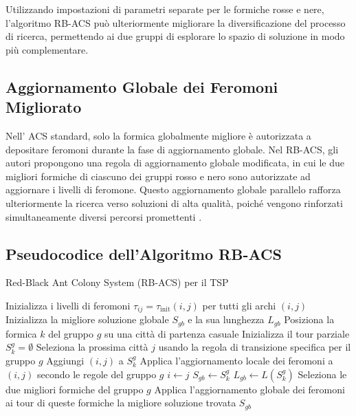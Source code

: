 Utilizzando impostazioni di parametri separate per le formiche rosse e nere, l'algoritmo \gls{RB-ACS} può ulteriormente migliorare la diversificazione del processo di ricerca, permettendo ai due gruppi di esplorare lo spazio di soluzione in modo più complementare.

\subsection{Aggiornamento Globale dei Feromoni Migliorato}
Nell' \gls{ACS} standard, solo la formica globalmente migliore è autorizzata a depositare feromoni durante la fase di aggiornamento globale. Nel \gls{RB-ACS}, gli autori propongono una regola di aggiornamento globale modificata, in cui le due migliori formiche di ciascuno dei gruppi rosso e nero sono autorizzate ad aggiornare i livelli di feromone. Questo aggiornamento globale parallelo rafforza ulteriormente la ricerca verso soluzioni di alta qualità, poiché vengono rinforzati simultaneamente diversi percorsi promettenti \cite{Hassan2013}.

\subsection{Pseudocodice dell'Algoritmo \gls{RB-ACS}}

\begin{algorithm}
	\caption{Red-Black Ant Colony System (\gls{RB-ACS}) per il \gls{TSP}}
	\begin{algorithmic}[1]
		\State Inizializza i livelli di feromoni $\tau_{ij} = \tau_{\text{init}}(i,j)$ per tutti gli archi $(i,j)$
		\State Inizializza la migliore soluzione globale $S_{gb}$ e la sua lunghezza $L_{gb}$
		\State Posiziona la formica $k$ del gruppo $g$ su una città di partenza casuale
		\State Inizializza il tour parziale $S_k^g = \emptyset$
		\Repeat
		\State Seleziona la prossima città $j$ usando la regola di transizione specifica per il gruppo $g$
		\State Aggiungi $(i,j)$ a $S_k^g$
		\State Applica l'aggiornamento locale dei feromoni a $(i,j)$ secondo le regole del gruppo $g$
		\State $i \gets j$
		\State $S_{gb} \gets S_k^g$
		\State $L_{gb} \gets L(S_k^g)$
		\EndIf
		\EndFor
		\EndFor
		\State Seleziona le due migliori formiche del gruppo $g$
		\State Applica l'aggiornamento globale dei feromoni ai tour di queste formiche
		\EndFor
		\EndFor
		\State \Return la migliore soluzione trovata $S_{gb}$
	\end{algorithmic}
\end{algorithm}



